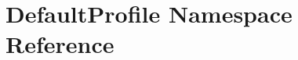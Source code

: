\hypertarget{namespaceDefaultProfile}{\section{Default\-Profile Namespace Reference}
\label{namespaceDefaultProfile}
}
